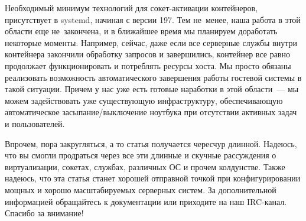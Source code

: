 \documentclass[10pt,oneside,a4paper]{article}
\begin{document}
Необходимый минимум технологий для сокет-активации контейнеров, присутствует в
systemd, начиная с версии 197. Тем не~менее, наша работа в этой области еще
не~закончена, и в ближайшее время мы планируем доработать некоторые моменты.
Например, сейчас, даже если все серверные службы внутри контейнера
закончили обработку запросов и завершились, контейнер все равно продолжает
функционировать и потреблять ресурсы хоста. Мы просто обязаны реализовать
возможность автоматического завершения работы гостевой системы в такой ситуации.
Причем у нас уже есть готовые наработки в этой области~--- мы можем
задействовать уже существующую инфраструктуру, обеспечивающую автоматическое
засыпание/выключение ноутбука при отсутствии активных задач и пользователей.

Впрочем, пора закругляться, а то статья получается чересчур длинной. Надеюсь,
что вы смогли продраться через все эти длинные и скучные рассуждения о
виртуализации, сокетах, службах, различных ОС и прочем колдунстве. Также
надеюсь, что эта статья станет хорошей отправной точкой при конфигурировании
мощных и хорошо масштабируемых серверных систем. За дополнительной информацией
обращайтесь к документации или приходите на наш IRC-канал. Спасибо за внимание!
\end{document}
